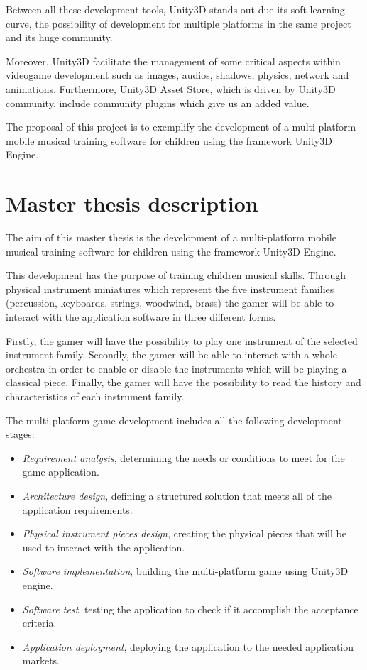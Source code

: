 Between all these development tools, Unity3D stands out due its soft learning curve, the possibility of development for multiple platforms in the same project and its huge community.

Moreover, Unity3D facilitate the management of some critical aspects within videogame development such as images, audios, shadows, physics, network and animations. Furthermore, Unity3D Asset Store, which is driven by Unity3D community, include community plugins which give us an added value.

The proposal of this project is to exemplify the development of a multi-platform mobile musical training software for children using the framework Unity3D Engine.

\section{Master thesis description}

The aim of this master thesis is the development of a multi-platform mobile musical training software for children using the framework Unity3D Engine.

This development has the purpose of training children musical skills. Through physical instrument miniatures which represent the five instrument families (percussion, keyboards, strings, woodwind, brass) the gamer will be able to interact with the application software in three different forms.

Firstly, the gamer will have the possibility to play one instrument of the selected instrument family. Secondly, the gamer will be able to interact with a whole orchestra in order to enable or disable the instruments which will be playing a classical piece. Finally, the gamer will have the possibility to read the history and characteristics of each instrument family.

The multi-platform game development includes all the following development stages:
\begin{itemize}
\item \textit{Requirement analysis}, determining the needs or conditions to meet for the game application.
\item \textit{Architecture design}, defining a structured solution that meets all of the application requirements.
\item \textit{Physical instrument pieces design}, creating the physical pieces that will be used to interact with the application.
\item \textit{Software implementation}, building the multi-platform game using Unity3D engine.
\item \textit{Software test}, testing the application to check if it accomplish the acceptance criteria.
\item \textit{Application deployment}, deploying the application to the needed application markets.
\end{itemize}

